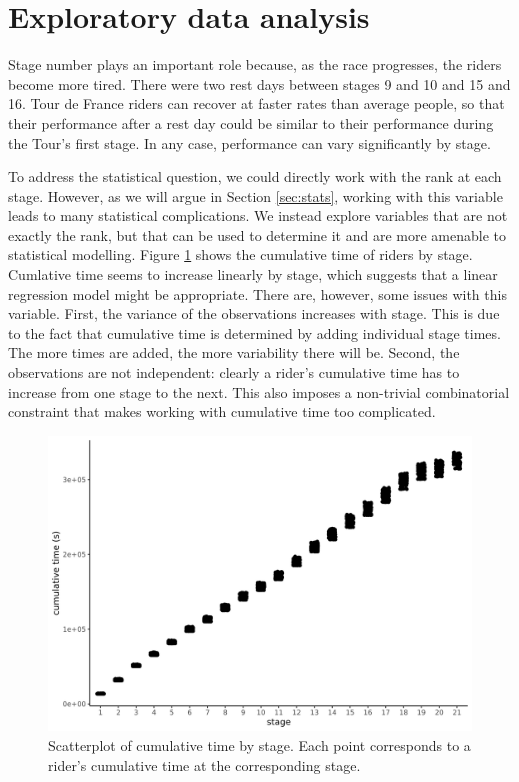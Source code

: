 \documentclass[aos,preprint]{imsart}
\begin{document}
\section{Exploratory data analysis} \label{sec:eda}


Stage number plays an important role because, as the race progresses, the riders become more tired. There were two rest days between stages 9 and 10 and 15 and 16. Tour de France riders can recover at faster rates than average people, so that their performance after a rest day could be similar to their performance during the Tour's first stage. In any case, performance can vary significantly by stage.

To address the statistical question, we could directly work with the rank at each stage. However, as we will argue in Section \ref{sec:stats}, working with this variable leads to many statistical complications. We instead explore variables that are not exactly the rank, but that can be used to determine it and are more amenable to statistical modelling. Figure \ref{fig:cumtime} shows the cumulative time of riders by stage. Cumlative time seems to increase linearly by stage, which suggests that a linear regression model might be appropriate. There are, however, some issues with this variable. First, the variance of the observations increases with stage. This is due to the fact that cumulative time is determined by adding individual stage times. The more times are added, the more variability there will be. Second, the observations are not independent: clearly a rider's cumulative time has to increase from one stage to the next. This also imposes a non-trivial combinatorial constraint that makes working with cumulative time too complicated. \\


\begin{figure}[h]
  \centering
  \includegraphics[scale=0.65]{fig/cumtime_stage.png}
  \caption{Scatterplot of cumulative time by stage. Each point corresponds to a rider's cumulative time at the corresponding stage.}
  \label{fig:cumtime}
\end{figure}
\end{document}
